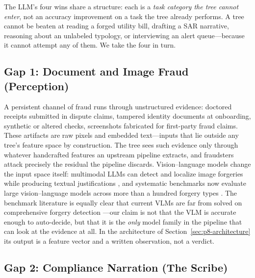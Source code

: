 \documentclass{article}
\providecommand{\secref}[1]{Section~\ref{#1}}
\begin{document}
The LLM's four wins share a structure: each is a \emph{task category the tree
cannot enter}, not an accuracy improvement on a task the tree already
performs. A tree cannot be beaten at reading a forged utility bill, drafting a
SAR narrative, reasoning about an unlabeled typology, or interviewing an alert
queue---because it cannot attempt any of them. We take the four in turn.

\subsection{Gap 1: Document and Image Fraud (Perception)}
\label{sec:p8-gap-docs}

A persistent channel of fraud runs through unstructured evidence:
doctored receipts submitted in dispute claims, tampered identity documents at
onboarding, synthetic or altered checks, screenshots fabricated for
first-party fraud claims. These artifacts are raw pixels and embedded
text---inputs that lie outside any tree's feature space by construction. The
tree sees such evidence only through whatever handcrafted features an upstream
pipeline extracts, and fraudsters attack precisely the residual the pipeline
discards. Vision--language models change the input space itself: multimodal
LLMs can detect and localize image forgeries while producing textual
justifications \citep{xu2024fakeshield}, and systematic benchmarks now
evaluate large vision--language models across more than a hundred forgery
types \citep{wang2025forensicsbench}. The benchmark literature is equally
clear that current VLMs are far from solved on comprehensive forgery
detection \citep{wang2025forensicsbench}---our claim is not that the VLM is
accurate enough to auto-decide, but that it is the \emph{only} model family in
the pipeline that can look at the evidence at all. In the architecture of
\secref{sec:p8-architecture} its output is a feature vector and a written
observation, not a verdict.

\subsection{Gap 2: Compliance Narration (The Scribe)}
\label{sec:p8-gap-narration}
\end{document}
